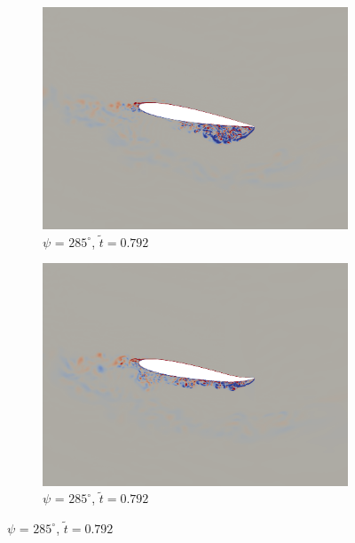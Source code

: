 \begin{figure}[H]
	\begin{subfigure}[b]{0.4\textwidth}
		\centering
		\includegraphics[width=1\textwidth]{figures/mu_1pt5/vorticity/baseline/phase_285.png}
		\caption{ $\psi$ = $285^\circ$, $\tilde{t}=0.792$}
		\label{fig:mu_1pt5_baseline_psi285}
	\end{subfigure}
	\begin{subfigure}[b]{0.4\textwidth}
		\centering
		\includegraphics[width=1\textwidth]{figures/mu_1pt5/vorticity/AC/phase_285.png}
		\caption{ $\psi$ = $285^\circ$,  $\tilde{t}=0.792$}
		\label{fig:mu_1pt5_AC_psi285}
	\end{subfigure}
	
	
	

\end{figure}
